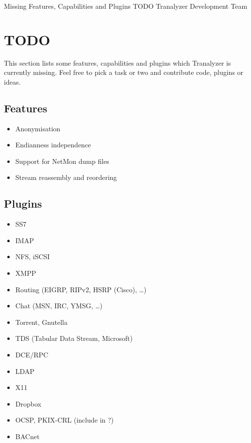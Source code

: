 \documentclass[documentation]{subfiles}
\begin{document}
\trantitle
    {Missing Features, Capabilities and Plugins}
    {TODO} %
    {Tranalyzer Development Team} %

\section{TODO}
This section lists some features, capabilities and plugins which Tranalyzer is currently missing. Feel free to pick a task or
two and contribute code, plugins or ideas.

\subsection{Features}
    \begin{itemize}
        \item Anonymisation
        \item Endianness independence
        \item Support for NetMon dump files
        \item Stream reassembly and reordering
    \end{itemize}

\subsection{Plugins}
\begin{multicols}{2}
    \begin{itemize}
        \item SS7
        \item IMAP
        \item NFS, iSCSI
        \item XMPP
        \item Routing (EIGRP, RIPv2, HSRP (Cisco), \ldots)
        \item Chat (MSN, IRC, YMSG, \ldots)
        \item Torrent, Gnutella
        \item TDS (Tabular Data Stream, Microsoft)
        \item DCE/RPC
        \item LDAP
        \item X11
        \item Dropbox
        \item OCSP, PKIX-CRL (include in ?)
        \item BACnet
    \end{itemize}
\end{multicols}
\end{document}
